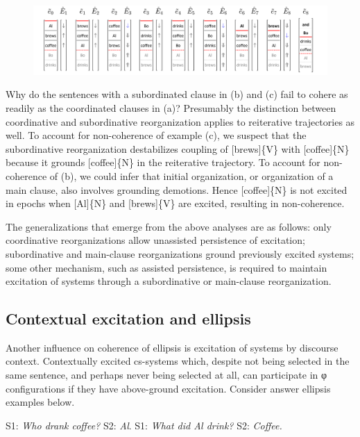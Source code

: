  
\begin{figure}
\includegraphics[width=\textwidth]{figures/Tilsen-img150.png}
\caption{\missingcaption}
\label{fig:}
\end{figure}
 

  Why do the sentences with a subordinated clause in (b) and (c) fail to cohere as readily as the coordinated clauses in (a)? Presumably the distinction between coordinative and subordinative reorganization applies to reiterative trajectories as well. To account for non-coherence of example (c), we suspect that the subordinative reorganization destabilizes coupling of [brews]\{V\} with [coffee]\{N\} because it grounds [coffee]\{N\} in the reiterative trajectory. To account for non-coherence of (b), we could infer that initial organization, or organization of a main clause, also involves grounding demotions. Hence [coffee]\{N\} is not excited in epochs when [Al]\{N\} and [brews]\{V\} are excited, resulting in non-coherence. 

  The generalizations that emerge from the above analyses are as follows: only coordinative reorganizations allow unassisted persistence of excitation; subordinative and main-clause reorganizations ground previously excited systems; some other mechanism, such as assisted persistence, is required to maintain excitation of systems through a subordinative or main-clause reorganization. 

\subsection{Contextual excitation and ellipsis}

Another influence on coherence of ellipsis is excitation of systems by discourse context. Contextually excited cs-systems which, despite not being selected in the same sentence, and perhaps never being selected at all, can participate in φ configurations if they have above-ground excitation. Consider answer ellipsis examples below.

\ea
   \ea    S1: \textit{Who drank coffee?}  S2: \textit{Al}.
    \ex    S1: \textit{What did Al drink?}   S2: \textit{Coffee.}
\z
\z

